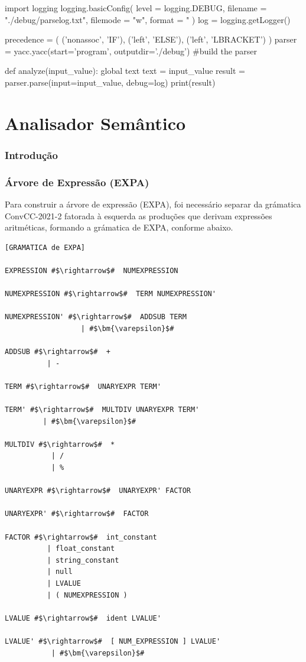 \documentclass[
	12pt,				%
	openright,			%
	twoside,			%
	a4paper,			%
	english,			%
	french,				%
	spanish,			%
	brazil				%
	]{abntex2}
\begin{document}
\begin{python}
import logging
logging.basicConfig(
    level = logging.DEBUG,
    filename = "./debug/parselog.txt",
    filemode = "w",
    format = "%
)
log = logging.getLogger()

precedence = (
    ('nonassoc', 'IF'), 
    ('left', 'ELSE'),
    ('left', 'LBRACKET')
)
parser = yacc.yacc(start='program', outputdir='./debug')  #build the parser

def analyze(input_value):
    global text
    text = input_value
    result = parser.parse(input=input_value, debug=log)
    print(result)
\end{python}


\part{Analisador Semântico}

\section{Introdução}


\section{Árvore de Expressão (EXPA)}

Para construir a árvore de expressão (EXPA),
foi necessário separar da grámatica ConvCC-2021-2 fatorada à esquerda as produções
que derivam expressões aritméticas, formando a grámatica de EXPA, conforme abaixo.

\begin{lstlisting}[escapechar=\#]
[GRAMATICA de EXPA]

EXPRESSION #$\rightarrow$#  NUMEXPRESSION 

NUMEXPRESSION #$\rightarrow$#  TERM NUMEXPRESSION' 

NUMEXPRESSION' #$\rightarrow$#  ADDSUB TERM 
                  | #$\bm{\varepsilon}$# 

ADDSUB #$\rightarrow$#  + 
          | - 

TERM #$\rightarrow$#  UNARYEXPR TERM' 

TERM' #$\rightarrow$#  MULTDIV UNARYEXPR TERM' 
         | #$\bm{\varepsilon}$# 

MULTDIV #$\rightarrow$#  * 
           | / 
           | % 

UNARYEXPR #$\rightarrow$#  UNARYEXPR' FACTOR 

UNARYEXPR' #$\rightarrow$#  FACTOR

FACTOR #$\rightarrow$#  int_constant 
          | float_constant 
          | string_constant 
          | null 
          | LVALUE 
          | ( NUMEXPRESSION ) 

LVALUE #$\rightarrow$#  ident LVALUE' 

LVALUE' #$\rightarrow$#  [ NUM_EXPRESSION ] LVALUE' 
           | #$\bm{\varepsilon}$#  
\end{lstlisting}
\end{document}
